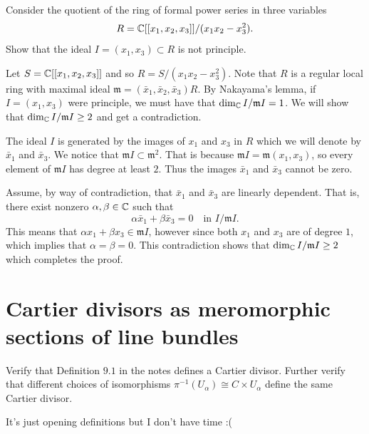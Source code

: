 \documentclass[11pt, a4paper]{article}
\begin{document}
\begin{exercise}
  Consider the quotient of the ring of formal power series in three variables
  \[
    R = \mathbb{C}[[x_1,x_2,x_3]] / (x_1 x_2 - x_3^2).
  \]
  Show that the ideal $I = (x_1, x_3) \subset R$ is not principle.
\end{exercise}
\begin{solution}
  Let $S = \mathbb{C}[[x_1,x_2,x_3]]$ and so $R = S/(x_1 x_2 - x_3^2)$.
  Note that $R$ is a regular local ring with maximal
  ideal $\mathfrak m = (\bar x_1,\bar x_2,\bar x_3) R$.
  By Nakayama's lemma, if $I = (x_1,x_3)$ were principle, we must have that
  $\dim_{\mathbb{C}} I/\mathfrak m I = 1$.
  We will show that $\dim_{\mathbb{C}} I/\mathfrak m I \geq 2$ and get a contradiction.

  The ideal $I$ is generated by the images of $x_1$ and $x_3$
  in $R$ which we will denote by $\bar x_1$ and $\bar x_3$.
  We notice that $\mathfrak m I \subset \mathfrak m^2$.
  That is because $\mathfrak m I = \mathfrak m(x_1,x_3)$,
  so every element of $\mathfrak m I$ has degree at least $2$.
  Thus the images $\bar x_1$ and $\bar x_3$ cannot be zero.

  Assume, by way of contradiction, that $\bar x_1$ and $\bar x_3$
  are linearly dependent.
  That is, there exist nonzero $\alpha,\beta \in \mathbb{C}$ such that
  \[
    \alpha \bar x_1 + \beta \bar x_3 = 0 \quad\text{in $I/\mathfrak m I$}.
  \]
  This means that $\alpha x_1 + \beta x_3 \in \mathfrak m I$,
  however since both $x_1$ and $x_3$ are of degree $1$,
  which implies that $\alpha = \beta = 0$.
  This contradiction shows that $\dim_{\mathbb{C}} I/\mathfrak m I \geq 2$
  which completes the proof.
\end{solution}

\newpage

\section{Cartier divisors as meromorphic sections of line bundles}

\begin{exercise}
  Verify that Definition $9.1$ in the notes defines a Cartier divisor.
  Further verify that different choices of isomorphisms
  $\pi^{-1}(U_{\alpha}) \cong C \times U_{\alpha}$
  define the same Cartier divisor.
\end{exercise}
\begin{solution}
  It's just opening definitions but I don't have time :(
\end{solution}
\end{document}
